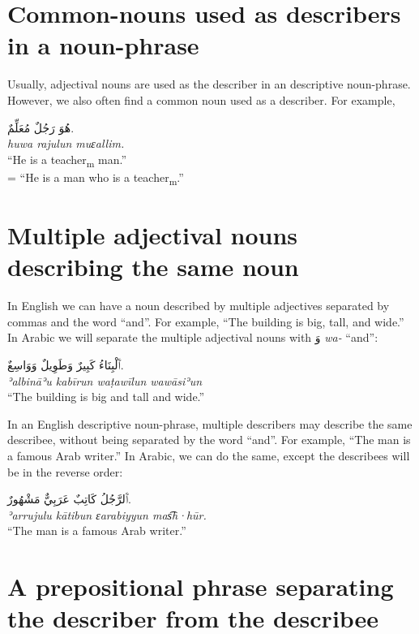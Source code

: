 \documentclass[
  10pt,
]{book}
\begin{document}
\section{Common-nouns used as describers in a noun-phrase}\label{common-nouns-used-as-describers-in-a-noun-phrase}

Usually, adjectival nouns are used as the describer in an descriptive noun-phrase. However, we also often find a common noun used as a describer. For example,

\foreignlanguage{arabic}{هُوَ رَجُلٌ مُعَلِّمٌ.}\\
\emph{huwa rajulun muɛallim.}\\
\enquote{He is a teacher\textsubscript{m} man.}\\
= \enquote{He is a man who is a teacher\textsubscript{m}.}

\section{Multiple adjectival nouns describing the same noun}\label{multiple-adjectival-nouns-describing-the-same-noun}

In English we can have a noun described by multiple adjectives separated by commas and the word \enquote{and}. For example, \enquote{The building is big, tall, and wide.} In Arabic we will separate the multiple adjectival nouns with \foreignlanguage{arabic}{وَ} \emph{wa-} \enquote{and}:

\foreignlanguage{arabic}{ٱَلْبِنَاءُ کَبِيرٌ وَطَوِيلٌ وَوَاسِعٌ.}\\
\emph{ʾalbināʾu kabīrun waṭawīlun wawāsiʾun}\\
\enquote{The building is big and tall and wide.}

In an English descriptive noun-phrase, multiple describers may describe the same describee, without being separated by the word \enquote{and}. For example, \enquote{The man is a famous Arab writer.} In Arabic, we can do the same, except the describees will be in the reverse order:

\foreignlanguage{arabic}{ٱَلرَّجُلُ کَاتِبٌ عَرَبِيٌّ مَشْهُورٌ.}\\
\emph{ʾarrujulu kātibun ɛarabiyyun mas͡h·hūr.}\\
\enquote{The man is a famous Arab writer.}

\section{A prepositional phrase separating the describer from the describee}\label{a-prepositional-phrase-separating-the-describer-from-the-describee}
\end{document}
